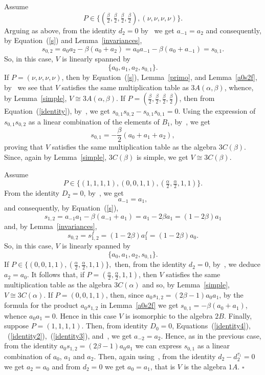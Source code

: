 \documentclass[a4paper]{amsart}
\newcommand{\al}{\alpha}
\newcommand{\bt}{\beta}
\begin{document}
Assume 
$$
P\in  \{(\tfrac{\bt}{2}, \tfrac{\bt}{ 2}, \tfrac{\bt}{ 2}, \tfrac{\bt}{ 2} ),  (\nu, \nu, \nu, \nu) \}.
$$ 
Arguing as above, from the identity $d_2=0$ by~\cite[genericsakuma.s]{code} we get $a_{-1}=a_2$ and consequently, by Equation~(\ref{s}) and Lemma~\ref{invariances},
\begin{equation}\label{identity}
s_{0,2}=a_0a_2-\bt(a_0+a_2)=a_0a_{-1}-\bt(a_0+a_{-1})=s_{0,1}.
\end{equation}
So, in this case, $V$ is linearly spanned by 
$$\{a_{0}, a_{1}, a_{2}, s_{0,1}\}.
$$
If $P= (\nu, \nu, \nu, \nu )$, then by Equation~(\ref{s}), Lemma~\ref{primo}, and Lemma~\ref{a0s2f}, by~\cite[genericsakuma.s]{code} we see that $V$ satisfies the same multiplication table as $3A(\al, \bt)$, whence, by Lemma~\ref{simple}, $V\cong 3A(\al, \bt)$.
 If $P=(\frac{\bt}{2}, \frac{\bt}{ 2}, \frac{\bt}{2}, \frac{\bt}{2})$, then from Equation~(\ref{identity}), by~\cite[genericsakuma.s]{code}, we get $s_{0,1}s_{0,2}-s_{0,1}s_{0,1}=0$. Using the expression of $s_{0,1}s_{0,2}$ as a linear combination of the elements of $B_1$, by~\cite[genericsakuma.s]{code}, we get
$$
s_{0,1}=-\frac{\bt}{2}(a_0+a_1+a_2),
$$ 
proving that  $V$ satisfies the same multiplication table as the algebra $3C(\bt)$. Since, again by Lemma~\ref{simple},  $3C(\bt)$ is simple, we get $V\cong 3C(\bt)$. 

Assume  
$$P \in 
\{(1,1,1,1), (0,0,1,1),  (\tfrac{\al}{2}, \tfrac{\al}{2}, 1,1 ) \}.
$$ 
From the identity $D_2=0$, by~\cite[genericsakuma.s]{code}, we get 
\begin{equation}\label{identity4}
a_{-1}=a_1,
\end{equation}
 and consequently, by Equation~(\ref{s}),
  \begin{equation}\label{identity2}
s_{1,2}=a_{-1}a_1-\bt(a_{-1}+a_1)=a_1-2\bt a_1=(1-2\bt)a_1
\end{equation} 
and, by Lemma~\ref{invariances},
\begin{equation}\label{identity3} 
s_{0,2}=s_{1,2}^f=(1-2\bt)a_1^f=(1-2\bt)a_0.
\end{equation}
So, in this case, $V$ is linearly spanned by 
$$\{a_{0}, a_{1}, a_{2}, s_{0,1}\}.
$$
If $P \in 
\{ (0,0,1,1),  (\tfrac{\al}{2}, \tfrac{\al}{2}, 1,1 ) \},
$
then,  from the identity $d_2=0$, by~\cite[genericsakuma.s]{code}, we deduce $a_2=a_0$.  It follows that, if $P=\left (\frac{\al}{2}, \frac{\al}{2}, 1,1 \right )$, then $V$ satisfies the same multiplication table as the algebra $3C(\al)$ and so, by Lemma~\ref{simple}, $V\cong 3C(\al)$. If $P=(0,0,1,1)$,  then, since  $a_0s_{1,2}=(2\bt-1)a_0a_1$, by the formula for the product $a_0s_{1,2}$ in Lemma~\ref{a0s2f} we get $s_{0,1}=-\bt(a_0+a_1)$, whence $a_0 a_1=0$. Hence in this case $V$ is isomorphic to the  algebra $2B$.
Finally, suppose $P=(1,1,1,1)$. Then, from identity $D_0=0$, Equations~(\ref{identity4}), ~(\ref{identity2}),~(\ref{identity3}), and~\cite[genericsakuma.s]{code}, we get $a_{-2}=a_2$. Hence, as in the previous case, from the identity $a_0s_{1,2}=(2\bt-1)a_0a_1$ we can express $s_{0,1}$ as a linear combination of $a_0$, $a_1$ and $a_2$. Then, again using~\cite[genericsakuma.s]{code}, from the identity  $d_2-d_2^{\tau_1}=0$ we get $a_2=a_0$ and from    $d_2=0$ we get $a_0=a_1$, that is $V$ is the algebra $1A$.
\hfill$\square$
\medskip
\end{document}
